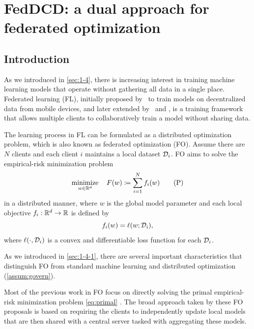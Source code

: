 \chapter{FedDCD: a dual approach for federated optimization}
\label{ch:Dual-Fed-Opt}

\section{Introduction} \label{sec:6-1}

As we introduced in \autoref{sec:1-4}, there is increasing interest in training machine learning models that operate without gathering all data in a single place. Federated learning (FL), initially proposed by~\citet{mcmahan2017communication} to train models on decentralized data from mobile devices, and later extended by~\citet{yang2019federated} and \citet{kairouz2019advances}, is a training framework that allows multiple clients to collaboratively train a model without sharing data. 

The learning process in FL can be formulated as a distributed optimization problem, which is also known as federated optimization (FO). Assume there are $N$ clients and each client $i$ maintains a local dataset $\mathcal{D}_i$. FO aims to solve the  empirical-risk minimization problem
\begin{equation} \label{eq:primal}
  \displaystyle\mathop{\hbox{\rm minimize}}_{w\in\mathbb{R}^d}\enspace\enspace F(w) \coloneqq \sum_{i = 1}^N f_i(w) \tag{P}
\end{equation}
in a distributed manner, where $w$ is the global model parameter and each local objective $f_i:\mathbb{R}^d \to\mathbb{R}$ is defined by 
\begin{equation*} %
    f_i(w) = \ell(w; \Dscr_i),
\end{equation*}
where $\ell(\cdot, \mathcal{D}_i)$ is a convex and differentiable loss function for each $\mathcal{D}_i$. 

As we introduced in \autoref{sec:1-4-1}, there are several important characteristics that distinguish FO from standard machine learning and distributed optimization (\autoref{assum:govern}). 

Most of the previous work in FO focus on directly solving the primal empirical-risk minimization problem \eqref{eq:primal}
\citep{mcmahan2017communication,li2018federated,yuan2021federated,karimireddy2020mime}. The broad approach taken by these FO proposals is based on requiring the clients to independently update local models that are then shared with a central server tasked with aggregating these models. 

